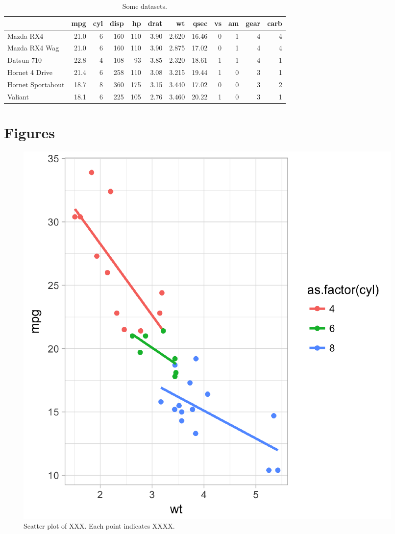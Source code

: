 \documentclass[12pt,]{article}
\begin{document}
\newpage

\hypertarget{section-1}{%
\section{}\label{section-1}}

\begin{table}[t]

\caption{\label{tab:tblm2}Some datasets.}
\centering
\begin{tabular}{l|r|r|r|r|r|r|r|r|r|r|r}
\hline
  & mpg & cyl & disp & hp & drat & wt & qsec & vs & am & gear & carb\\
\hline
Mazda RX4 & 21.0 & 6 & 160 & 110 & 3.90 & 2.620 & 16.46 & 0 & 1 & 4 & 4\\
\hline
Mazda RX4 Wag & 21.0 & 6 & 160 & 110 & 3.90 & 2.875 & 17.02 & 0 & 1 & 4 & 4\\
\hline
Datsun 710 & 22.8 & 4 & 108 & 93 & 3.85 & 2.320 & 18.61 & 1 & 1 & 4 & 1\\
\hline
Hornet 4 Drive & 21.4 & 6 & 258 & 110 & 3.08 & 3.215 & 19.44 & 1 & 0 & 3 & 1\\
\hline
Hornet Sportabout & 18.7 & 8 & 360 & 175 & 3.15 & 3.440 & 17.02 & 0 & 0 & 3 & 2\\
\hline
Valiant & 18.1 & 6 & 225 & 105 & 2.76 & 3.460 & 20.22 & 1 & 0 & 3 & 1\\
\hline
\end{tabular}
\end{table}

\newpage

\hypertarget{figures}{%
\section{Figures}\label{figures}}

\begin{figure}
\centering
\includegraphics{main_text_files/figure-latex/scatplt-1.pdf}
\caption{\label{fig:scatplt}Scatter plot of XXX. Each point indicates XXXX.}
\end{figure}
\end{document}
